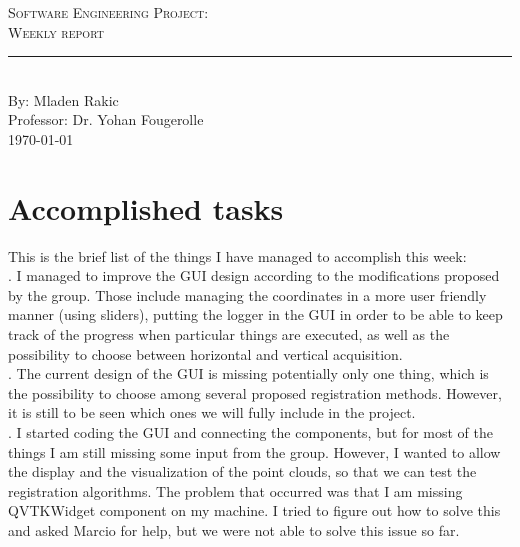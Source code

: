 \documentclass[aps,letterpaper,11pt]{revtex4}
\newcommand{\labno}{Software Engineering Project}
\newcommand{\labtitle}{Weekly report}
\newcommand{\authorname}{Mladen Rakic}
\newcommand{\professor}{Dr. Yohan Fougerolle}
\begin{document}
  
\begin{titlepage}
\begin{center}
{\LARGE \textsc{\labno:} \\ \vspace{4pt}}
{\Large \textsc{\labtitle} \\ \vspace{4pt}} 
\rule[13pt]{\textwidth}{1pt} \\ \vspace{150pt}
{\large By: \authorname \\ \vspace{10pt}
Professor: \professor \\ \vspace{10pt}
\today}
\end{center}


\end{titlepage}%
\newpage
\section {Accomplished tasks}
This is the brief list of the things I have managed to accomplish this week:\\
. I managed to improve the GUI design according to the modifications proposed by the group. Those include managing the coordinates in a more user friendly manner (using sliders), putting the logger in the GUI in order to be able to keep track of the progress when particular things are executed, as well as the possibility to choose between horizontal and vertical acquisition.\\ 
. The current design of the GUI is missing potentially only one thing, which is the possibility to choose among several proposed registration methods. However, it is still to be seen which ones we will fully include in the project. \\ 
. I started coding the GUI and connecting the components, but for most of the things I am still missing some input from the group. However, I wanted to allow the display and the visualization of the point clouds, so that we can test the registration algorithms. The problem that occurred was that I am missing QVTKWidget component on my machine. I tried to figure out how to solve this and asked Marcio for help, but we were not able to solve this issue so far.\\
\pagebreak
\end{document}
